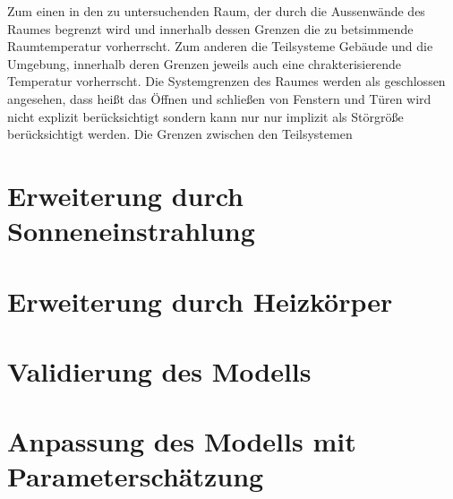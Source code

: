 Zum einen in den zu untersuchenden Raum, der durch die Aussenwände des Raumes begrenzt wird und innerhalb dessen Grenzen die zu betsimmende Raumtemperatur vorherrscht. Zum anderen die Teilsysteme Gebäude und die Umgebung, innerhalb deren Grenzen jeweils auch eine chrakterisierende Temperatur vorherrscht. Die Systemgrenzen des Raumes werden als geschlossen angesehen, dass heißt das Öffnen und schließen von Fenstern und Türen wird nicht explizit berücksichtigt sondern kann nur nur implizit als Störgröße berücksichtigt werden. Die Grenzen zwischen den Teilsystemen 


\section{Erweiterung durch Sonneneinstrahlung}


\section{Erweiterung durch Heizkörper}

\section{Validierung des Modells}

\section{Anpassung des Modells mit Parameterschätzung}